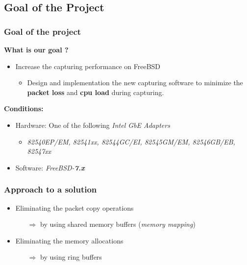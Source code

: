 \documentclass{beamer}
\begin{document}
\subsection*{Goal of the Project}
\begin{frame}
\frametitle{Goal of the project}
\textbf{What is our goal ?}
\begin{itemize}
	\item Increase the capturing performance on FreeBSD
		\begin{itemize}
			\item Design and implementation the new capturing software to
				minimize the \textbf{packet loss} and \textbf{cpu load} during capturing. \newline \newline
		\end{itemize}
\end{itemize}
\textbf{Conditions:}
\begin{itemize}
	\item Hardware: One of the following \emph{Intel GbE Adapters}
		\begin{itemize}
			\item \small{\emph{82540EP/EM, 82541xx, 82544GC/EI, 82545GM/EM, 82546GB/EB, 82547xx}}
		\end{itemize}
	\item Software:	\emph{FreeBSD-\textbf{7.x}}
\end{itemize}
\end{frame}

\begin{frame}
\frametitle{Approach to a solution}
\begin{itemize}
	\item Eliminating the packet copy operations
		\begin{itemize}
			\item [$\Rightarrow$] by using shared memory buffers (\emph{memory mapping})\newline
		\end{itemize}
	\item Eliminating the memory allocations
		\begin{itemize}
			\item [$\Rightarrow$] by using ring buffers
		\end{itemize}
\end{itemize}
\end{frame}
\end{document}
